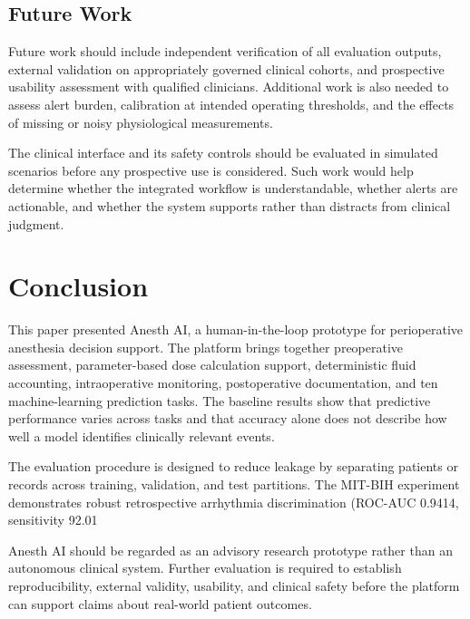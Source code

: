 \documentclass[conference]{IEEEtran}
\begin{document}
\subsection{Future Work}
Future work should include independent verification of all evaluation outputs, external validation on appropriately governed clinical cohorts, and prospective usability assessment with qualified clinicians. Additional work is also needed to assess alert burden, calibration at intended operating thresholds, and the effects of missing or noisy physiological measurements.

The clinical interface and its safety controls should be evaluated in simulated scenarios before any prospective use is considered. Such work would help determine whether the integrated workflow is understandable, whether alerts are actionable, and whether the system supports rather than distracts from clinical judgment.

\section{Conclusion}
This paper presented Anesth AI, a human-in-the-loop prototype for perioperative anesthesia decision support. The platform brings together preoperative assessment, parameter-based dose calculation support, deterministic fluid accounting, intraoperative monitoring, postoperative documentation, and ten machine-learning prediction tasks. The baseline results show that predictive performance varies across tasks and that accuracy alone does not describe how well a model identifies clinically relevant events.

The evaluation procedure is designed to reduce leakage by separating patients or records across training, validation, and test partitions. The MIT-BIH experiment demonstrates robust retrospective arrhythmia discrimination (ROC-AUC 0.9414, sensitivity 92.01%

Anesth AI should be regarded as an advisory research prototype rather than an autonomous clinical system. Further evaluation is required to establish reproducibility, external validity, usability, and clinical safety before the platform can support claims about real-world patient outcomes.
\end{document}

